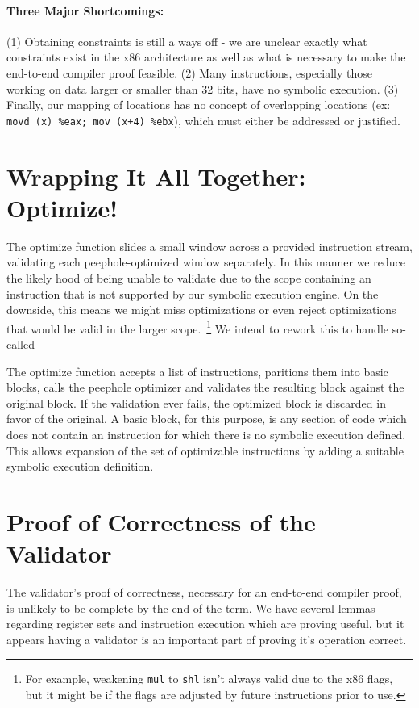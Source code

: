 \documentclass{article}
\begin{document}
\paragraph{Three Major Shortcomings: }
(1) Obtaining constraints is still a ways off - we are unclear exactly
what constraints exist in the x86 architecture as well as what is
necessary to make the end-to-end compiler proof feasible. (2) Many
instructions, especially those working on data larger or smaller than
32 bits, have no symbolic execution.  (3) Finally, our mapping of
locations has no concept of overlapping locations (ex: {\tt movd (x) \%eax;
mov (x+4) \%ebx}), which must either be addressed or justified.

\section{Wrapping It All Together: Optimize!}
The optimize function slides a small window across a provided
instruction stream, validating each peephole-optimized window
separately.  In this manner we reduce the likely hood of being unable
to validate due to the scope containing an instruction that is not
supported by our symbolic execution engine.  On the downside, this
means we might miss optimizations or even reject optimizations that
would be valid in the larger scope.~\footnote{For example, weakening
  {\tt mul} to {\tt shl} isn't always valid due to the x86 flags, but
  it might be if the flags are adjusted by future instructions prior
  to use.} We intend to rework this to handle so-called

The optimize function accepts a list of instructions, paritions them
into basic blocks, calls the peephole optimizer and validates the
resulting block against the original block.  If the validation ever
fails, the optimized block is discarded in favor of the original.  A
basic block, for this purpose, is any section of code which does not
contain an instruction for which there is no symbolic execution
defined. This allows expansion of the set of optimizable instructions
by adding a suitable symbolic execution definition.

\section{Proof of Correctness of the Validator}
The validator's proof of correctness, necessary for an end-to-end
compiler proof, is unlikely to be complete by the end of the term.  We
have several lemmas regarding register sets and instruction execution
which are proving useful, but it appears having a validator is an
important part of proving it's operation correct.
\end{document}

